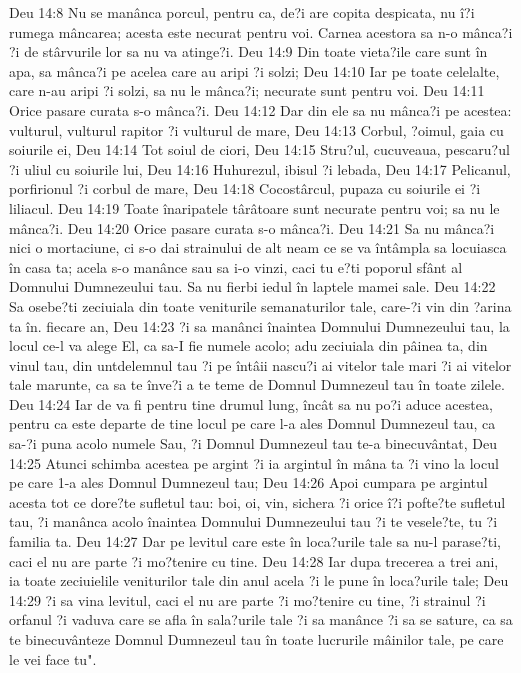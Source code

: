 Deu 14:8  Nu se manânca porcul, pentru ca, de?i are copita despicata, nu î?i rumega mâncarea; acesta este necurat pentru voi. Carnea acestora sa n-o mânca?i ?i de stârvurile lor sa nu va atinge?i.
Deu 14:9  Din toate vieta?ile care sunt în apa, sa mânca?i pe acelea care au aripi ?i solzi;
Deu 14:10  Iar pe toate celelalte, care n-au aripi ?i solzi, sa nu le mânca?i; necurate sunt pentru voi.
Deu 14:11  Orice pasare curata s-o mânca?i.
Deu 14:12  Dar din ele sa nu mânca?i pe acestea: vulturul, vulturul rapitor ?i vulturul de mare,
Deu 14:13  Corbul, ?oimul, gaia cu soiurile ei,
Deu 14:14  Tot soiul de ciori,
Deu 14:15  Stru?ul, cucuveaua, pescaru?ul ?i uliul cu soiurile lui,
Deu 14:16  Huhurezul, ibisul ?i lebada,
Deu 14:17  Pelicanul, porfirionul ?i corbul de mare,
Deu 14:18  Cocostârcul, pupaza cu soiurile ei ?i liliacul.
Deu 14:19  Toate înaripatele târâtoare sunt necurate pentru voi; sa nu le mânca?i.
Deu 14:20  Orice pasare curata s-o mânca?i.
Deu 14:21  Sa nu mânca?i nici o mortaciune, ci s-o dai strainului de alt neam ce se va întâmpla sa locuiasca în casa ta; acela s-o manânce sau sa i-o vinzi, caci tu e?ti poporul sfânt al Domnului Dumnezeului tau. Sa nu fierbi iedul în laptele mamei sale.
Deu 14:22  Sa osebe?ti zeciuiala din toate veniturile semanaturilor tale, care-?i vin din ?arina ta în. fiecare an,
Deu 14:23  ?i sa manânci înaintea Domnului Dumnezeului tau, la locul ce-l va alege El, ca sa-I fie numele acolo; adu zeciuiala din pâinea ta, din vinul tau, din untdelemnul tau ?i pe întâii nascu?i ai vitelor tale mari ?i ai vitelor tale marunte, ca sa te înve?i a te teme de Domnul Dumnezeul tau în toate zilele.
Deu 14:24  Iar de va fi pentru tine drumul lung, încât sa nu po?i aduce acestea, pentru ca este departe de tine locul pe care l-a ales Domnul Dumnezeul tau, ca sa-?i puna acolo numele Sau, ?i Domnul Dumnezeul tau te-a binecuvântat,
Deu 14:25  Atunci schimba acestea pe argint ?i ia argintul în mâna ta ?i vino la locul pe care 1-a ales Domnul Dumnezeul tau;
Deu 14:26  Apoi cumpara pe argintul acesta tot ce dore?te sufletul tau: boi, oi, vin, sichera ?i orice î?i pofte?te sufletul tau, ?i manânca acolo înaintea Domnului Dumnezeului tau ?i te vesele?te, tu ?i familia ta.
Deu 14:27  Dar pe levitul care este în loca?urile tale sa nu-l parase?ti, caci el nu are parte ?i mo?tenire cu tine.
Deu 14:28  Iar dupa trecerea a trei ani, ia toate zeciuielile veniturilor tale din anul acela ?i le pune în loca?urile tale;
Deu 14:29  ?i sa vina levitul, caci el nu are parte ?i mo?tenire cu tine, ?i strainul ?i orfanul ?i vaduva care se afla în sala?urile tale ?i sa manânce ?i sa se sature, ca sa te binecuvânteze Domnul Dumnezeul tau în toate lucrurile mâinilor tale, pe care le vei face tu".
